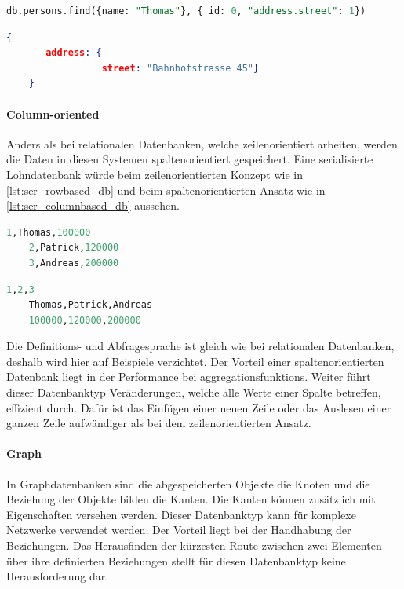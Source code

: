 \begin{lstlisting}[language=SQL, caption=Abfrage in MongoDB, label=lst:select_mongodb]  
    db.persons.find({name: "Thomas"}, {_id: 0, "address.street": 1})
\end{lstlisting}

\begin{lstlisting}[language=JSON, caption=Resultat der Abfrage in MongoDB, label=lst:select_result_mongodb]  
    {
       address: {
                 street: "Bahnhofstrasse 45"}
    }
\end{lstlisting}

\paragraph{Column-oriented}
Anders als bei relationalen Datenbanken, welche zeilenorientiert arbeiten, werden die Daten in diesen Systemen spaltenorientiert gespeichert. Eine serialisierte Lohndatenbank würde beim 
zeilenorientierten Konzept wie in \autoref{lst:ser_rowbased_db} und beim spaltenorientierten Ansatz wie in \autoref{lst:ser_columnbased_db} aussehen.

\begin{lstlisting}[language=SQL, caption=Serialisierung zeilenorientierte Datenbank, label=lst:ser_rowbased_db]  
    1,Thomas,100000
    2,Patrick,120000
    3,Andreas,200000
\end{lstlisting}

\begin{lstlisting}[language=SQL, caption=Serialisierung spaltenorientierte Datenbank, label=lst:ser_columnbased_db]  
    1,2,3
    Thomas,Patrick,Andreas
    100000,120000,200000
\end{lstlisting}

Die Definitions- und Abfragesprache ist gleich wie bei relationalen Datenbanken, deshalb wird hier auf Beispiele verzichtet. Der Vorteil 
einer spaltenorientierten Datenbank liegt in der Performance bei \glspl{aggregationsfunktion}. Weiter führt dieser Datenbanktyp Veränderungen, 
welche alle Werte einer Spalte betreffen, effizient durch. Dafür ist das Einfügen einer neuen Zeile oder das Auslesen einer ganzen Zeile aufwändiger als bei dem zeilenorientierten Ansatz.

\paragraph{Graph}
In Graphdatenbanken sind die abgespeicherten Objekte die Knoten und die Beziehung der Objekte bilden die Kanten. Die Kanten können zusätzlich mit Eigenschaften versehen werden. Dieser 
Datenbanktyp kann für komplexe Netzwerke verwendet werden. Der Vorteil liegt bei der Handhabung der Beziehungen. Das Herausfinden der kürzesten Route zwischen zwei Elementen über 
ihre definierten Beziehungen stellt für diesen Datenbanktyp keine Herausforderung dar.

